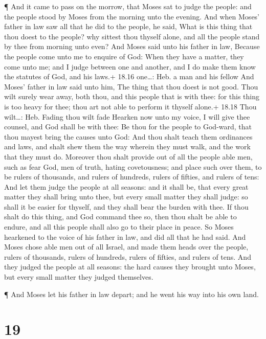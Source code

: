  ¶ And it came to pass on the morrow, that Moses sat to
judge the people: and the people stood by Moses from the morning unto
the evening.  And when Moses' father in law saw all that he
did to the people, he said, What is this thing that thou doest to the
people? why sittest thou thyself alone, and all the people stand by thee
from morning unto even?  And Moses said unto his father in
law, Because the people come unto me to enquire of God: 
When they have a matter, they come unto me; and I judge between one and
another, and I do make them know the statutes of God, and his laws.+
18.16 one\ldots: Heb. a man and his fellow  And Moses'
father in law said unto him, The thing that thou doest is not good.
 Thou wilt surely wear away, both thou, and this people
that is with thee: for this thing is too heavy for thee; thou art not
able to perform it thyself alone.+ 18.18 Thou wilt\ldots: Heb. Fading
thou wilt fade  Hearken now unto my voice, I will give thee
counsel, and God shall be with thee: Be thou for the people to God-ward,
that thou mayest bring the causes unto God:  And thou shalt
teach them ordinances and laws, and shalt shew them the way wherein they
must walk, and the work that they must do.  Moreover thou
shalt provide out of all the people able men, such as fear God, men of
truth, hating covetousness; and place such over them, to be rulers of
thousands, and rulers of hundreds, rulers of fifties, and rulers of
tens:  And let them judge the people at all seasons: and it
shall be, that every great matter they shall bring unto thee, but every
small matter they shall judge: so shall it be easier for thyself, and
they shall bear the burden with thee.  If thou shalt do
this thing, and God command thee so, then thou shalt be able to endure,
and all this people shall also go to their place in peace. 
So Moses hearkened to the voice of his father in law, and did all that
he had said.  And Moses chose able men out of all Israel,
and made them heads over the people, rulers of thousands, rulers of
hundreds, rulers of fifties, and rulers of tens.  And they
judged the people at all seasons: the hard causes they brought unto
Moses, but every small matter they judged themselves.

 ¶ And Moses let his father in law depart; and he went his
way into his own land.

\hypertarget{section-18}{%
\section{19}\label{section-18}}

